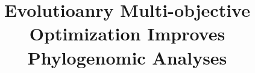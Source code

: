 \documentclass[runningheads]{llncs}
\begin{document}
%
\title{ Evolutioanry Multi-objective Optimization Improves Phylogenomic Analyses}
\author{}
\institute{}
%
\maketitle              %
%

 
 







%
%
%



%
\end{document}
